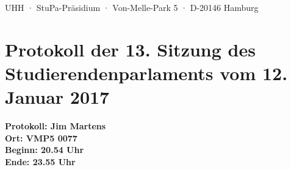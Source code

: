 \documentclass[ngerman,headheight=70pt]{scrartcl}
\begin{document}
    UHH · StuPa-Präsidium · Von-Melle-Park 5 · D-20146 Hamburg

    \section*{Protokoll der 13. Sitzung des Studierendenparlaments vom 12. Januar 2017}

    \textbf{Protokoll: Jim Martens}\\
    \textbf{Ort: VMP5 0077}\\
    \textbf{Beginn: 20.54 Uhr}\\
    \textbf{Ende: 23.55 Uhr}

    \vspace{0.5cm}
\end{document}

